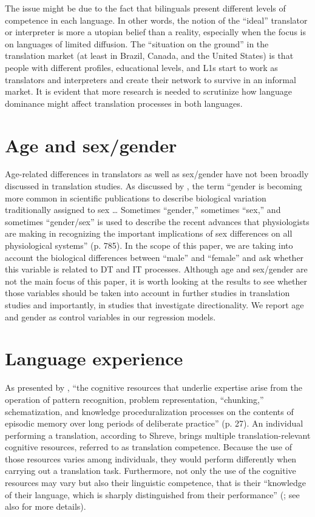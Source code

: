 \documentclass[output=paper]{langscibook}
\begin{document}
The issue might be due to the fact that bilinguals present different levels of competence in each language. In other words, the notion of the “ideal” translator or interpreter is more a utopian belief than a reality, especially when the focus is on languages of limited diffusion. The ``situation on the ground'' in the translation market (at least in Brazil, Canada, and the United States) is that people with different profiles, educational levels, and L1s start to work as translators and interpreters and create their network to survive in an informal market. It is evident that more research is needed to scrutinize how language dominance might affect translation processes in both languages. 

\section{Age and sex/gender}
Age-related differences in translators as well as sex/gender have not been broadly discussed in translation studies. As discussed by \citet{torgrimson2005sex}, the term “gender is becoming more common in scientific publications to describe biological variation traditionally assigned to sex … Sometimes “gender,” sometimes “sex,” and sometimes “gender/sex” is used to describe the recent advances that physiologists are making in recognizing the important implications of sex differences on all physiological systems” (p. 785). In the scope of this paper, we are taking into account the biological differences between “male” and “female” and ask whether this variable is related to DT and IT processes. Although age and sex/gender are not the main focus of this paper, it is worth looking at the results to see whether those variables should be taken into account in further studies in translation studies and importantly, in studies that investigate directionality. We report age and gender as control variables in our regression models.

\section{Language experience}
As presented by \citet{shreve2006deliberate}, “the cognitive resources that underlie expertise arise from the operation of pattern recognition, problem representation, “chunking,” schematization, and knowledge proceduralization processes on the contents of episodic memory over long periods of deliberate practice” (p. 27). An individual performing a translation, according to Shreve, brings multiple translation-relevant cognitive resources, referred to as translation competence. Because the use of those resources varies among individuals, they would perform differently when carrying out a translation task. Furthermore, not only the use of the cognitive resources may vary but also their linguistic competence, that is their “knowledge of their language, which is sharply distinguished from their performance” (\citealt[122]{malmkjaer2009translation}; see also \citealt{chomsky19651965} for more details).
\end{document}
